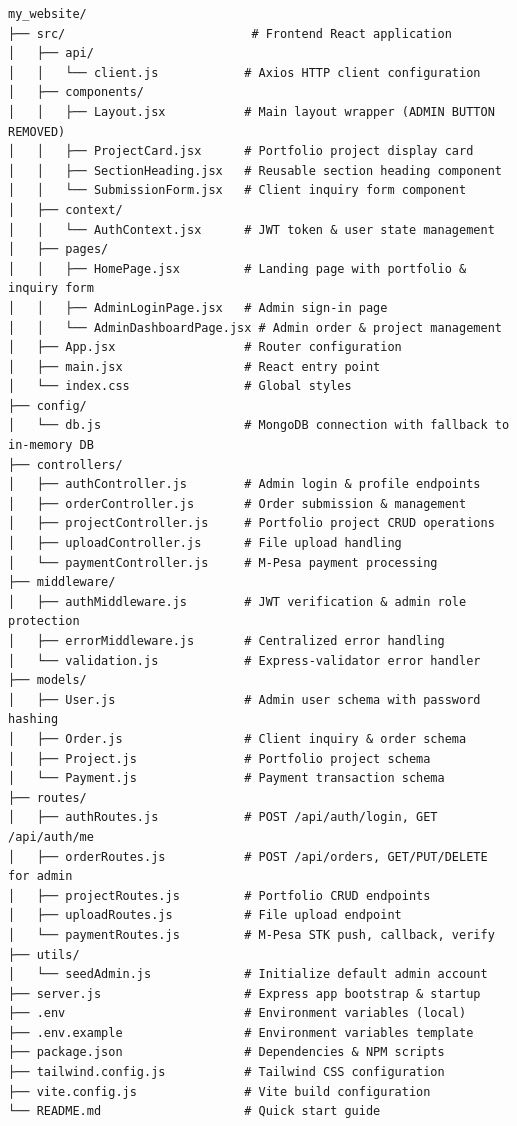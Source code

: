 \documentclass[12pt]{article}
\begin{document}
\begin{verbatim}
my_website/
├── src/                          # Frontend React application
│   ├── api/
│   │   └── client.js            # Axios HTTP client configuration
│   ├── components/
│   │   ├── Layout.jsx           # Main layout wrapper (ADMIN BUTTON REMOVED)
│   │   ├── ProjectCard.jsx      # Portfolio project display card
│   │   ├── SectionHeading.jsx   # Reusable section heading component
│   │   └── SubmissionForm.jsx   # Client inquiry form component
│   ├── context/
│   │   └── AuthContext.jsx      # JWT token & user state management
│   ├── pages/
│   │   ├── HomePage.jsx         # Landing page with portfolio & inquiry form
│   │   ├── AdminLoginPage.jsx   # Admin sign-in page
│   │   └── AdminDashboardPage.jsx # Admin order & project management
│   ├── App.jsx                  # Router configuration
│   ├── main.jsx                 # React entry point
│   └── index.css                # Global styles
├── config/
│   └── db.js                    # MongoDB connection with fallback to in-memory DB
├── controllers/
│   ├── authController.js        # Admin login & profile endpoints
│   ├── orderController.js       # Order submission & management
│   ├── projectController.js     # Portfolio project CRUD operations
│   ├── uploadController.js      # File upload handling
│   └── paymentController.js     # M-Pesa payment processing
├── middleware/
│   ├── authMiddleware.js        # JWT verification & admin role protection
│   ├── errorMiddleware.js       # Centralized error handling
│   └── validation.js            # Express-validator error handler
├── models/
│   ├── User.js                  # Admin user schema with password hashing
│   ├── Order.js                 # Client inquiry & order schema
│   ├── Project.js               # Portfolio project schema
│   └── Payment.js               # Payment transaction schema
├── routes/
│   ├── authRoutes.js            # POST /api/auth/login, GET /api/auth/me
│   ├── orderRoutes.js           # POST /api/orders, GET/PUT/DELETE for admin
│   ├── projectRoutes.js         # Portfolio CRUD endpoints
│   ├── uploadRoutes.js          # File upload endpoint
│   └── paymentRoutes.js         # M-Pesa STK push, callback, verify
├── utils/
│   └── seedAdmin.js             # Initialize default admin account
├── server.js                    # Express app bootstrap & startup
├── .env                         # Environment variables (local)
├── .env.example                 # Environment variables template
├── package.json                 # Dependencies & NPM scripts
├── tailwind.config.js           # Tailwind CSS configuration
├── vite.config.js               # Vite build configuration
└── README.md                    # Quick start guide
\end{verbatim}
\end{document}
